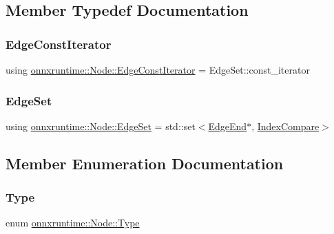 \subsection{Member Typedef Documentation}
\mbox{\label{classonnxruntime_1_1Node_ae0df52e26b0237505b6a0cbc25106d9d}} 
\subsubsection{\texorpdfstring{Edge\+Const\+Iterator}{EdgeConstIterator}}
{\footnotesize\ttfamily using \mbox{\hyperlink{classonnxruntime_1_1Node_ae0df52e26b0237505b6a0cbc25106d9d}{onnxruntime\+::\+Node\+::\+Edge\+Const\+Iterator}} =  Edge\+Set\+::const\+\_\+iterator}

\mbox{\label{classonnxruntime_1_1Node_a21f67a4ba50eb4c6dea0c37982b48da8}} 
\subsubsection{\texorpdfstring{Edge\+Set}{EdgeSet}}
{\footnotesize\ttfamily using \mbox{\hyperlink{classonnxruntime_1_1Node_a21f67a4ba50eb4c6dea0c37982b48da8}{onnxruntime\+::\+Node\+::\+Edge\+Set}} =  std\+::set$<$\mbox{\hyperlink{classonnxruntime_1_1Node_1_1EdgeEnd}{Edge\+End}}$\ast$, \mbox{\hyperlink{structonnxruntime_1_1Node_1_1IndexCompare}{Index\+Compare}}$>$}



\subsection{Member Enumeration Documentation}
\mbox{\label{classonnxruntime_1_1Node_a2d9625711aecc66f9b9373d61f794f6a}} 
\subsubsection{\texorpdfstring{Type}{Type}}
{\footnotesize\ttfamily enum \mbox{\hyperlink{classonnxruntime_1_1Node_a2d9625711aecc66f9b9373d61f794f6a}{onnxruntime\+::\+Node\+::\+Type}}\hspace{0.3cm}{\ttfamily [strong]}}

